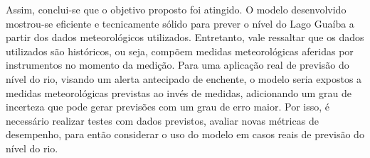 Assim, conclui-se que o objetivo proposto foi atingido. O modelo desenvolvido mostrou-se eficiente e tecnicamente sólido para prever o nível do Lago Guaíba a partir dos dados meteorológicos utilizados. Entretanto, vale ressaltar que os dados utilizados são históricos, ou seja, compõem medidas meteorológicas aferidas por instrumentos no momento da medição. Para uma aplicação real de previsão do nível do rio, visando um alerta antecipado de enchente, o modelo seria expostos a medidas meteorológicas previstas ao invés de medidas, adicionando um grau de incerteza que pode gerar previsões com um grau de erro maior. Por isso, é necessário realizar testes com dados previstos, avaliar novas métricas de desempenho, para então considerar o uso do modelo em casos reais de previsão do nível do rio.  